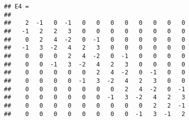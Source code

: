 \begin{samepage}
\begin{Shaded}
	\begin{Highlighting}[]
\NormalTok{v = [}\NormalTok{;}\NormalTok{*}\NormalTok{(}\NormalTok{));}\NormalTok{];}

\NormalTok{(}
\NormalTok{(}\NormalTok{(}\NormalTok{(}\NormalTok{)),}
\NormalTok{(}\NormalTok{(}\NormalTok{(}\NormalTok{)),-}		
	\end{Highlighting}
\end{Shaded}
\end{samepage}

\begin{samepage}
\begin{verbatim}
## E4 =
## 
##    2  -1   0  -1   0   0   0   0   0   0   0   0
##   -1   2   2   3   0   0   0   0   0   0   0   0
##    0   2   4  -2   0  -1   0   0   0   0   0   0
##   -1   3  -2   4   2   3   0   0   0   0   0   0
##    0   0   0   2   4  -2   0  -1   0   0   0   0
##    0   0  -1   3  -2   4   2   3   0   0   0   0
##    0   0   0   0   0   2   4  -2   0  -1   0   0
##    0   0   0   0  -1   3  -2   4   2   3   0   0
##    0   0   0   0   0   0   0   2   4  -2   0  -1
##    0   0   0   0   0   0  -1   3  -2   4   2   3
##    0   0   0   0   0   0   0   0   0   2   2  -1
##    0   0   0   0   0   0   0   0  -1   3  -1   2
\end{verbatim}
\end{samepage}

\begin{samepage}
\begin{Shaded}
	\begin{Highlighting}[]
\NormalTok{(}
\NormalTok{(}\NormalTok{(}\NormalTok{(}\NormalTok{)),}
\NormalTok{(}\NormalTok{(}\NormalTok{(}\NormalTok{)),-}		
	\end{Highlighting}
\end{Shaded}
\end{samepage}

